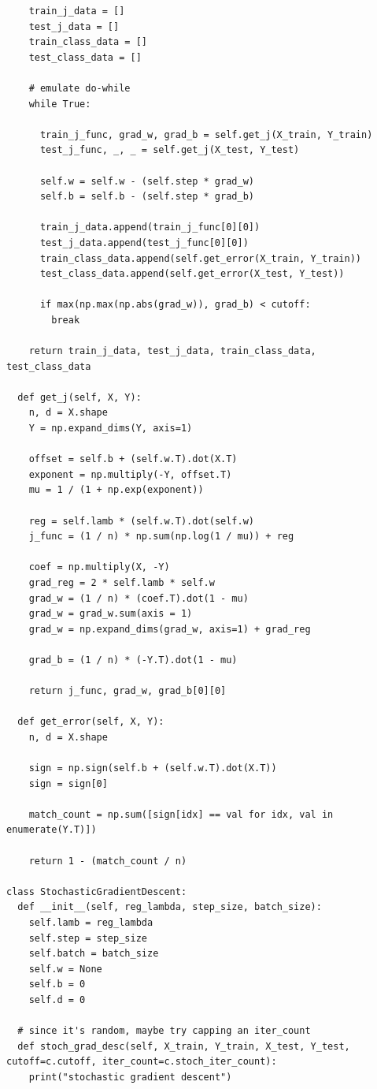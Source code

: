 \documentclass{article}
\newcommand{\1}{\mathbf{1}}
\begin{document}
{\begin{verbatim}
    train_j_data = []
    test_j_data = []
    train_class_data = []
    test_class_data = []

    # emulate do-while
    while True:

      train_j_func, grad_w, grad_b = self.get_j(X_train, Y_train)
      test_j_func, _, _ = self.get_j(X_test, Y_test)

      self.w = self.w - (self.step * grad_w)
      self.b = self.b - (self.step * grad_b)

      train_j_data.append(train_j_func[0][0])
      test_j_data.append(test_j_func[0][0])
      train_class_data.append(self.get_error(X_train, Y_train))
      test_class_data.append(self.get_error(X_test, Y_test))

      if max(np.max(np.abs(grad_w)), grad_b) < cutoff:
        break

    return train_j_data, test_j_data, train_class_data, test_class_data

  def get_j(self, X, Y):
    n, d = X.shape
    Y = np.expand_dims(Y, axis=1)

    offset = self.b + (self.w.T).dot(X.T)
    exponent = np.multiply(-Y, offset.T)
    mu = 1 / (1 + np.exp(exponent))

    reg = self.lamb * (self.w.T).dot(self.w)
    j_func = (1 / n) * np.sum(np.log(1 / mu)) + reg

    coef = np.multiply(X, -Y)
    grad_reg = 2 * self.lamb * self.w
    grad_w = (1 / n) * (coef.T).dot(1 - mu)
    grad_w = grad_w.sum(axis = 1)
    grad_w = np.expand_dims(grad_w, axis=1) + grad_reg

    grad_b = (1 / n) * (-Y.T).dot(1 - mu)

    return j_func, grad_w, grad_b[0][0]

  def get_error(self, X, Y):
    n, d = X.shape

    sign = np.sign(self.b + (self.w.T).dot(X.T))
    sign = sign[0]

    match_count = np.sum([sign[idx] == val for idx, val in enumerate(Y.T)])

    return 1 - (match_count / n)

class StochasticGradientDescent:
  def __init__(self, reg_lambda, step_size, batch_size):
    self.lamb = reg_lambda
    self.step = step_size
    self.batch = batch_size
    self.w = None
    self.b = 0
    self.d = 0

  # since it's random, maybe try capping an iter_count
  def stoch_grad_desc(self, X_train, Y_train, X_test, Y_test, cutoff=c.cutoff, iter_count=c.stoch_iter_count):
    print("stochastic gradient descent")


\end{verbatim}}
\end{document}
